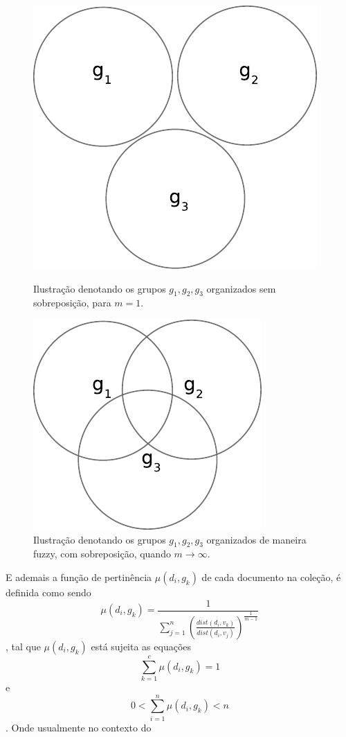 \begin{figure}[!htp] \centering \begin{minipage}{0.45\textwidth} \centering
\includegraphics[width=0.6\columnwidth]{assets/clusters_crisp.pdf} \caption{Ilustração denotando os
grupos $g_1,g_2,g_3$ organizados sem sobreposição, para $m = 1$.} \label{fig:cluster_crisp}
\end{minipage}\hfill \begin{minipage}{0.45\textwidth} \centering
\includegraphics[width=0.6\columnwidth]{assets/clusters_fuzzy.pdf} \caption{Ilustração denotando os
grupos $g_1,g_2,g_3$ organizados de maneira fuzzy, com sobreposição, quando $m \rightarrow \infty$.}
\label{fig:cluster_fuzzy} \end{minipage} \end{figure} E ademais a função de pertinência
$\mu(d_i,g_k)$ de cada documento na coleção, é definida como sendo \begin{equation} \mu(d_i,g_k) =
\frac{1}{\sum_{j=1}^n(\frac{dist(d_i,v_k)}{dist(d_i,v_j)})^{\frac{1}{m-1}}} \label{eq:pertinencia}
\end{equation} , tal que $\mu(d_i, g_k)$ está sujeita as equações \begin{equation} \sum_{k=1}^c
\mu(d_i,g_k) = 1 \label{eq:pert_restricao_1} \end{equation} e \begin{equation} 0 < \sum_{i=1}^n
\mu(d_i,g_k) < n \label{eq:pert_restricao_2} \end{equation} . Onde usualmente no contexto do
